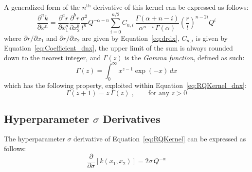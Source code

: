 \documentclass{article}
\begin{document}
A generalized form of the $n^{\text{th}}$-derivative of this kernel can be expressed as follows:
\begin{equation}
\label{eq:RQKernel_dnx}
	\frac{\partial^n k}{\partial x^n} = \frac{\partial^a r}{\partial x_1^a} \frac{\partial^b r}{\partial x_2^b} \frac{\sigma^2}{l^n} Q^{-\alpha - n} \sum_{i=0}^{n/2} C_{n,i} \, \frac{\Gamma\!\left(\alpha + n - i\right)}{\alpha^{n-i} \, \Gamma\!\left(\alpha\right)} \left(\frac{r}{l}\right)^{n-2i} Q^i
\end{equation}
where $\partial r/\partial x_1$ and $\partial r/\partial x_2$ are given by Equation~\eqref{eq:drdx}, $C_{n,i}$ is given by Equation~\eqref{eq:Coefficient_dnx}, the upper limit of the sum is always rounded down to the nearest integer, and $\Gamma\!\left(z\right)$ is the \emph{Gamma function}, defined as such:
\begin{equation}
\label{eq:GammaFunction}
	\Gamma\!\left(z\right) = \int_{0}^{\infty} x^{z-1} \exp{\left(-x\right)} \, dx
\end{equation}
which has the following property, exploited within Equation~\eqref{eq:RQKernel_dnx}:
\begin{equation}
\label{eq:GammaRecursionProperty}
	\Gamma\!\left(z + 1\right) = z \, \Gamma\!\left(z\right) \; , \qquad \text{for any} \; z > 0
\end{equation}

\subsection{Hyperparameter $\sigma$ Derivatives}
\label{subsec:RQHypDer_s}

The hyperparameter $\sigma$ derivative of Equation~\eqref{eq:RQKernel} can be expressed as follows:
\begin{equation}
\label{eq:RQKernel_ds}
	\frac{\partial}{\partial \sigma} \left[k\!\left(x_1,x_2\right)\right] = 2 \sigma \, Q^{-\alpha}
\end{equation}

\begin{comment}
\begin{equation}
\label{eq:RQKernel_ds_d1x}
	\begin{gathered}
	\frac{\partial}{\partial \sigma} \left[\frac{\partial k\!\left(x_1,x_2\right)}{\partial x_1}\right] = - \frac{\partial r}{\partial x_1} \frac{2 \sigma r}{l^2} z^{-\alpha - 1} \\
	\frac{\partial}{\partial \sigma} \left[\frac{\partial k\!\left(x_1,x_2\right)}{\partial x_2}\right] = - \frac{\partial r}{\partial x_2} \frac{2 \sigma r}{l^2} z^{-\alpha - 1}
	\end{gathered}
\end{equation}

\begin{equation}
\label{eq:RQKernel_ds_d2x}
	\frac{\partial}{\partial \sigma} \left[\frac{\partial^2 k\!\left(x_1,x_2\right)}{\partial x_1 \partial x_2}\right] = \frac{\partial r}{\partial x_1} \frac{\partial r}{\partial x_2} \frac{2 \sigma}{l^2} \left(\frac{r^2}{l^2} \frac{2\alpha + 1}{2\alpha} - 1\right) z^{-\alpha - 2}
\end{equation}
\end{comment}
\end{document}
